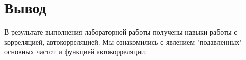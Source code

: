 \documentclass[a4paper,12pt]{article}
\begin{document}
	
	\section{Вывод}
		
	В результате выполнения лабораторной работы получены навыки работы с корреляцией, автокорреляцией. Мы ознакомились с явлением "подавленных" основных частот и функцией автокорреляции.
		
	\newpage
	
\end{document}
